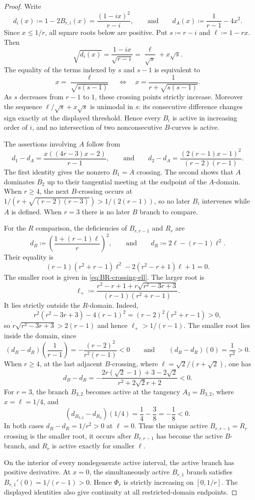 \documentclass[10pt]{article}
\numberwithin{equation}{section}
\begin{document}
\begin{proof}
Write
\[
 d_i(x)\coloneqq1-2B_{r,i}(x)=\frac{(1-ix)^2}{r-i},
 \qquad\text{and}\qquad
 d_A(x)\coloneqq\frac1{r-1}-4x^2.
\]
Since $x\le1/r$, all square roots below are positive.  Put $s\coloneqq r-i$ and $\ell\coloneqq1-rx$.  Then
\[
 \sqrt{d_i(x)}=\frac{1-ix}{\sqrt{r-i}}
 =\frac{\ell}{\sqrt s}+x\sqrt s.
\]
The equality of the terms indexed by $s$ and $s-1$ is equivalent to
\[
 x=\frac{\ell}{\sqrt{s(s-1)}}
 \quad\Longleftrightarrow\quad
 x=\frac1{r+\sqrt{s(s-1)}}.
\]
As $s$ decreases from $r-1$ to $1$, these crossing points strictly increase.  Moreover the sequence $\ell/\sqrt s+x\sqrt s$ is unimodal in $s$: its consecutive difference changes sign exactly at the displayed threshold.  Hence every $B_i$ is active in increasing order of $i$, and no intersection of two nonconsecutive $B$-curves is active.

The assertions involving $A$ follow from
\[
 d_1-d_A=\frac{x((4r-3)x-2)}{r-1},
 \qquad\text{and}\qquad
 d_2-d_A=\frac{(2(r-1)x-1)^2}{(r-2)(r-1)}.
\]
The first identity gives the nonzero $B_1=A$ crossing.  The second shows that $A$ dominates $B_2$ up to their tangential meeting at the endpoint of the $A$-domain.  When $r\ge4$, the next $B$-crossing occurs at $1/(r+\sqrt{(r-2)(r-3)})>1/(2(r-1))$, so no later $B_i$ intervenes while $A$ is defined.  When $r=3$ there is no later $B$ branch to compare.

For the $R$ comparison, the deficiencies of $B_{r,r-1}$ and $R_r$ are
\[
 d_B\coloneqq\left(\frac{1+(r-1)\ell}{r}\right)^2,
 \qquad\text{and}\qquad
 d_R\coloneqq2\ell-(r-1)\ell^2.
\]
Their equality is
\[
 (r-1)(r^2+r-1)\ell^2-2(r^2-r+1)\ell+1=0.
\]
The smaller root is given in \cref{eq:BR-crossing-ell}.  The larger root is
\[
 \ell_+\coloneqq\frac{r^2-r+1+r\sqrt{r^2-3r+3}}
 {(r-1)(r^2+r-1)}.
\]
It lies strictly outside the $R$-domain.  Indeed,
\[
 r^2(r^2-3r+3)-4(r-1)^2
 =(r-2)^2(r^2+r-1)>0,
\]
so $r\sqrt{r^2-3r+3}>2(r-1)$ and hence $\ell_+>1/(r-1)$.  The smaller root lies inside the domain, since
\[
 (d_B-d_R)\left(\frac1{r-1}\right)
 =-\frac{(r-2)^2}{r^2(r-1)}<0
 \qquad
 \text{and}
 \qquad
 (d_B-d_R)(0)=\frac1{r^2}>0.
\]
When $r\ge4$, at the last adjacent $B$-crossing, where $\ell=\sqrt2/(r+\sqrt2)$, one has
\[
 d_B-d_R
 =-\frac{2r(\sqrt2-1)+3-2\sqrt2}{r^2+2\sqrt2 r+2}<0.
\]
For $r=3$, the branch $B_{3,2}$ becomes active at the tangency $A_3=B_{3,2}$, where $x=\ell=1/4$, and
\[
 (d_{B_{3,2}}-d_{R_3})(1/4)=\frac14-\frac38=-\frac18<0.
\]
In both cases $d_B-d_R=1/r^2>0$ at $\ell=0$.  Thus the unique active $B_{r,r-1}=R_r$ crossing is the smaller root, it occurs after $B_{r,r-1}$ has become the active $B$-branch, and $R_r$ is active exactly for smaller $\ell$.

On the interior of every nondegenerate active interval, the active branch has positive derivative.  At $x=0$, the simultaneously active $B_{r,1}$ branch satisfies $B_{r,1}'(0)=1/(r-1)>0$.  Hence $\Phi_r$ is strictly increasing on $[0,1/r]$.  The displayed identities also give continuity at all restricted-domain endpoints.
\end{proof}
\end{document}
